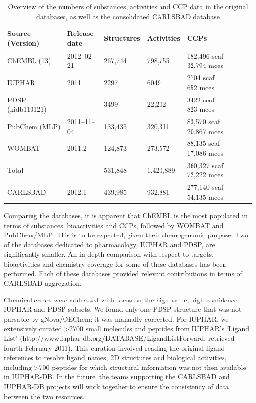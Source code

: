 \begin{table}[]
\caption{Overview of the numbers of substances, activities and CCP data in the original databases, as well as the consolidated CARLSBAD database}
\label{tab:cb_02}
\centering
\begin{tabular}{p{0.25\linewidth}p{0.15\linewidth}p{0.15\linewidth}p{0.15\linewidth}p{0.30\linewidth}}
\hline
\textbf{Source (Version)} & \textbf{Release date} & \textbf{Structures} & \textbf{Activities} & \textbf{CCPs} \\
\hline
ChEMBL (13) & 2012–02–21 & 267,744 & 798,755 & \makecell[l]{182,496 scaf \\ 32,794 mces} \\
IUPHAR & 2011 & 2297 & 6049 & \makecell[l]{2704 scaf \\ 652 mces} \\
PDSP (kidb110121) & & 3499 & 22,202 & \makecell[l]{3422 scaf \\ 823 mces} \\
PubChem (MLP) & 2011–11–04 & 133,435 & 320,311 & \makecell[l]{83,570 scaf \\ 20,867 mces} \\
WOMBAT & 2011.2 & 124,873  & 273,572 & \makecell[l]{88,135 scaf \\ 17,086 mces} \\
Total & & 531,848 & 1,420,889 & \makecell[l]{360,327 scaf \\ 72,222 mces} \\
CARLSBAD & 2012.1 & 439,985 & 932,881 & \makecell[l]{277,140 scaf \\ 54,135 mces} \\
\hline
\end{tabular}
\end{table}

Comparing the databases, it is apparent that ChEMBL is the most populated in terms of substances, bioactivities and CCPs, followed by WOMBAT and PubChem/MLP. This is to be expected, given their chemogenomic purpose. Two of the databases dedicated to pharmacology, IUPHAR and PDSP, are significantly smaller. An in-depth comparison with respect to targets, bioactivities and chemistry coverage for some of these databases has been performed\cite{Tiikkainen2012-cw}. Each of these databases provided relevant contributions in terms of CARLSBAD aggregation.

Chemical errors were addressed with focus on the high-value, high-confidence IUPHAR and PDSP subsets. We found only one PDSP structure that was not parsable by gNova/OEChem; it was manually corrected. For IUPHAR, we extensively curated \textgreater 2700 small molecules and peptides from IUPHAR’s ‘Ligand List’ (http://www.iuphar-db.org/DATABASE/LigandListForward: retrieved fourth February 2011). This curation involved reading the original ligand references to resolve ligand names, 2D structures and biological activities, including \textgreater700 peptides for which structural information was not then available in IUPHAR-DB\cite{Harding2018-ut}. In the future, the teams supporting the CARLSBAD and IUPHAR-DB projects will work together to ensure the consistency of data between the two resources.

